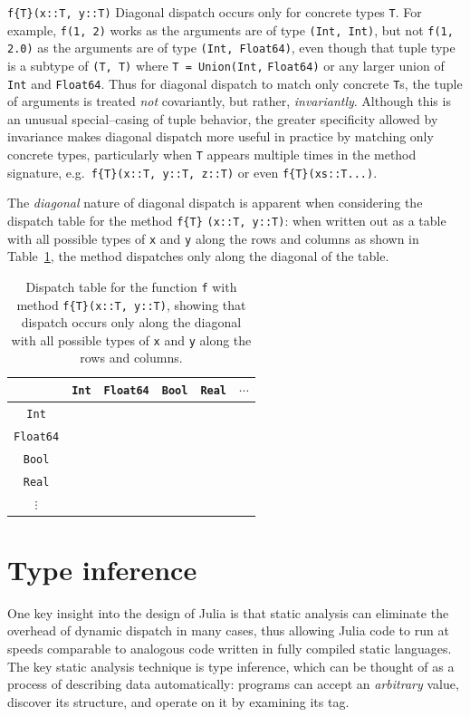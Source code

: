 \documentclass[pldi]{sigplanconf-pldi15}
\begin{document}
\verb|f{T}(x::T, y::T)|
%
Diagonal dispatch occurs only for concrete types \verb|T|. For example,
\verb|f(1, 2)| works as the arguments are of type \verb|(Int, Int)|, but not
\verb|f(1, 2.0)| as the arguments are of type \verb|(Int, Float64)|, even
though that tuple type is a subtype of \verb|(T, T)| where
\verb|T = Union(Int,| \verb|Float64)| or any larger union of \verb|Int| and
\verb|Float64|. Thus for diagonal dispatch to match only concrete \verb|T|s,
the tuple of arguments is treated \textit{not} covariantly, but rather,
\textit{invariantly}. Although this is an unusual special--casing of tuple
behavior, the greater specificity allowed by invariance makes diagonal dispatch
more useful in practice by matching only concrete types, particularly when
\verb|T| appears multiple times in the method signature, e.g.\ 
\verb|f{T}(x::T, y::T, z::T)| or even \verb|f{T}(xs::T...)|. 

The \textit{diagonal} nature of diagonal dispatch is apparent when considering
the dispatch table for the method \verb|f{T}| \verb|(x::T, y::T)|: when written
out as a table with all possible types of \texttt{x} and \texttt{y} along the
rows and columns as shown in Table~\ref{tab:diagonal}, the method dispatches
only along the diagonal of the table.

\begin{table}
\begin{tabular}{c | c c c c c}
	& \verb|Int| & \verb|Float64| & \verb|Bool| & \verb|Real| & $\cdots$ \\ \hline
	\verb|Int|     & \checkmark &  &  &  & \\
	\verb|Float64| &  & \checkmark &  &  & \\
	\verb|Bool|    &  &  & \checkmark &  & \\
	\verb|Real|    &  &  &  &  & \\
	$\vdots$       &  &  &  &  &
\end{tabular}
\caption{Dispatch table for the function \texttt{f} with method
\texttt{f\{T\}(x::T, y::T)}, showing that dispatch occurs only along the
diagonal with all possible types of \texttt{x} and \texttt{y} along the rows
and columns.}
\label{tab:diagonal}
\end{table}


\section{Type inference}

One key insight into the design of Julia is that static analysis can eliminate
the overhead of dynamic dispatch in many cases, thus allowing Julia code to run
at speeds comparable to analogous code written in fully compiled static
languages. The key static analysis technique is type inference, which can be
thought of as a process of describing data automatically: programs can accept
an \emph{arbitrary} value, discover its structure, and operate on it by
examining its tag.
\end{document}

